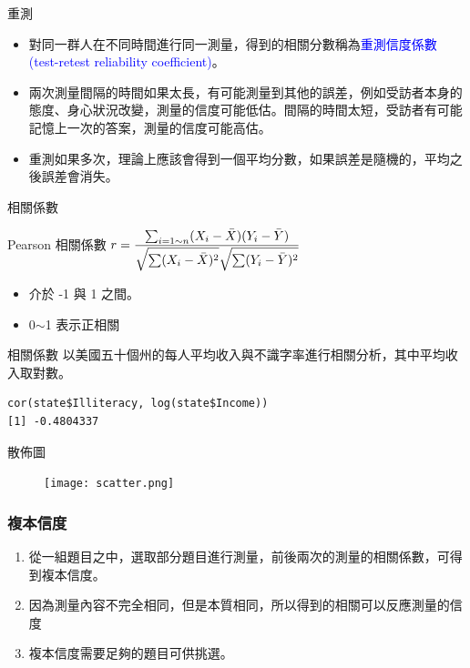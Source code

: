 \documentclass[xcolor=dvipsnames, 13pt]{beamer}
\begin{document}
\begin{frame}{重測}
\begin{itemize}
\item 對同一群人在不同時間進行同一測量，得到的相關分數稱為\textcolor{blue}{重測信度係數 (test-retest reliability
coefficient)}。
\item 兩次測量間隔的時間如果太長，有可能測量到其他的誤差，例如受訪者本身的態度、身心狀況改變，測量的信度可能低估。間隔的時間太短，受訪者有可能記憶上一次的答案，測量的信度可能高估。
\item 重測如果多次，理論上應該會得到一個平均分數，如果誤差是隨機的，平均之後誤差會消失。
\end{itemize}
\end{frame}
\begin{frame}{相關係數}
\begin{block}{Pearson 相關係數}
$r=\mathlarger {\frac{\sum_{i=1\sim n} (X_{i}-\bar{X})(Y_{i}-\bar{Y})}{\sqrt{\sum (X_{i}-\bar{X})^2} \sqrt{ \sum (Y_{i}-\bar{Y})^2} }}$
\end{block}
\begin{itemize}
\item 介於 -1 與 1 之間。
\item 0$\sim$1 表示正相關
\end{itemize}
\end{frame}
\begin{frame}[fragile]{相關係數}
以美國五十個州的每人平均收入與不識字率進行相關分析，其中平均收入取對數。
\bigskip
\begin{Verbatim}[frame=single,label=\textit{R code}]
cor(state$Illiteracy, log(state$Income))
[1] -0.4804337
\end{Verbatim}
\end{frame}

\begin{frame}{散佈圖}
\begin{figure}
\begin{center}
\texttt{[image: scatter.png]}
\end{center}
\end{figure}
\end{frame}
\begin{frame}\frametitle{複本信度}
\begin{enumerate}
\item 從一組題目之中，選取部分題目進行測量，前後兩次的測量的相關係數，可得到複本信度。
\item 因為測量內容不完全相同，但是本質相同，所以得到的相關可以反應測量的信度
\item 複本信度需要足夠的題目可供挑選。
\end{enumerate}
\end{frame}
\end{document}
